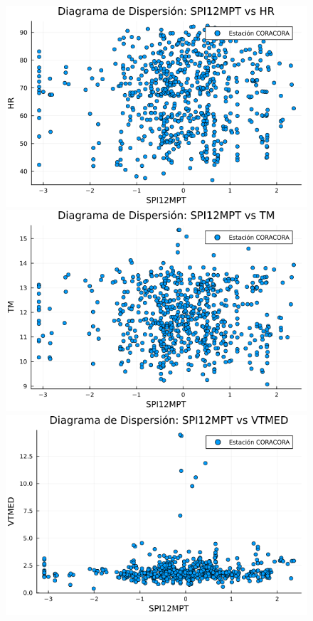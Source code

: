 \begin{figure}[htbp]
\begin{minipage}{0.32\textwidth}
    \centering
    \includegraphics[width=\linewidth]{Capitulos/Scaterplot/CORACORA_SPI12MPT_vs_HR.png}
\end{minipage}\hfill
\begin{minipage}{0.32\textwidth}
    \centering
    \includegraphics[width=\linewidth]{Capitulos/Scaterplot/CORACORA_SPI12MPT_vs_TM.png}
\end{minipage}\hfill
\begin{minipage}{0.32\textwidth}
    \centering
    \includegraphics[width=\linewidth]{Capitulos/Scaterplot/CORACORA_SPI12MPT_vs_VTMED.png}
\end{minipage}


\end{figure}

